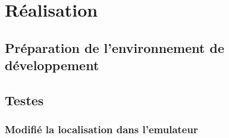 
\chapter{Réalisation}
\section{Préparation de l'environnement de développement}%
\section{Testes}
\subsection{Modifié la localisation dans l'emulateur}%
